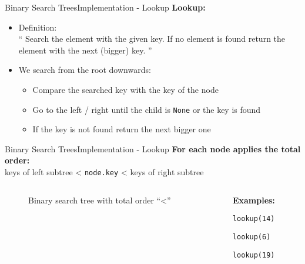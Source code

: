 
\begin{frame}{Binary Search Trees}{Implementation - Lookup}
  \textbf{Lookup:}
  \begin{itemize}
    \item
      Definition:\\
      \enquote{
        Search the element with the given key.
        If no element is found return the element with the next (bigger) key.
      }
    \item
      We search from the root downwards:
      \begin{itemize}
        \item
          Compare the searched key with the key of the node
        \item
          Go to the left / right until the child is
          \texttt{\color{Mittel-Blau}None} or the key is found
        \item
          If the key is not found return the next bigger one
      \end{itemize}
  \end{itemize}
\end{frame}


\begin{frame}{Binary Search Trees}{Implementation - Lookup}
  \textbf{For each node applies the total order:}\\
  \hspace{1.5em}keys of left subtree
  < \texttt{\color{Mittel-Blau}node.key} < keys of right 
  subtree
  \begin{columns}
    \begin{column}{0.77\linewidth}
      \begin{figure}
        \begin{adjustbox}{width=\linewidth}
          
        \end{adjustbox}
        \caption{Binary search tree with total order
          \enquote{\color{Mittel-Blau}<}}
        \label{fig:binary_search_trees:binary_tree_lookup}
      \end{figure}
    \end{column}
    \begin{column}{0.23\linewidth}
      \textbf{Examples:}
      \begin{compactitem}[{\color{Uni-Grau}\footnotesize$\blacksquare$}]
        \item
          \texttt{\color{red}lookup(14)}
        \item
          \texttt{\color{Mittel-Gruen!50!blue}lookup(6)}
        \item
          \texttt{\color{yellow!50!orange}lookup(19)}
      \end{compactitem}
    \end{column}
  \end{columns}
\end{frame}

